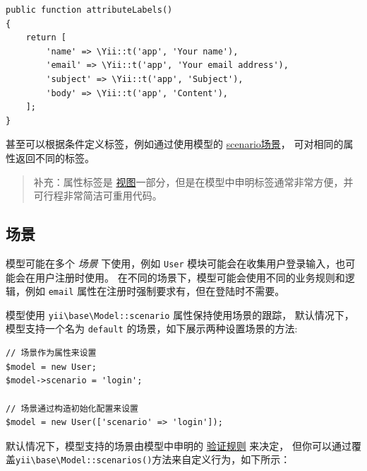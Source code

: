 \lstset{language=php}\begin{lstlisting}
public function attributeLabels()
{
    return [
        'name' => \Yii::t('app', 'Your name'),
        'email' => \Yii::t('app', 'Your email address'),
        'subject' => \Yii::t('app', 'Subject'),
        'body' => \Yii::t('app', 'Content'),
    ];
}
\end{lstlisting}
甚至可以根据条件定义标签，例如通过使用模型的 \hyperref[structure-models.md::::scenarios]{scenario场景}，
可对相同的属性返回不同的标签。

\begin{quote}补充：属性标签是 \hyperref[structure-views.md]{视图}一部分，但是在模型中申明标签通常非常方便，并可行程非常简洁可重用代码。

\end{quote}
\subsection{场景 \label{structure-models.md::scenarios}}
模型可能在多个 \textit{场景} 下使用，例如 \lstinline|User| 模块可能会在收集用户登录输入，也可能会在用户注册时使用。
在不同的场景下，模型可能会使用不同的业务规则和逻辑，例如 \lstinline|email| 属性在注册时强制要求有，但在登陆时不需要。

模型使用 \texttt{yii{\allowbreak{}\textbackslash}base{\allowbreak{}\textbackslash}Model\allowbreak{}::\allowbreak{}scenario} 属性保持使用场景的跟踪，
默认情况下，模型支持一个名为 \lstinline|default| 的场景，如下展示两种设置场景的方法:

\lstset{language=php}\begin{lstlisting}
// 场景作为属性来设置
$model = new User;
$model->scenario = 'login';

// 场景通过构造初始化配置来设置
$model = new User(['scenario' => 'login']);
\end{lstlisting}
默认情况下，模型支持的场景由模型中申明的 \hyperref[structure-models.md::::validation-rules]{验证规则} 来决定，
但你可以通过覆盖\texttt{yii{\allowbreak{}\textbackslash}base{\allowbreak{}\textbackslash}Model\allowbreak{}::\allowbreak{}scenarios()}方法来自定义行为，如下所示：

